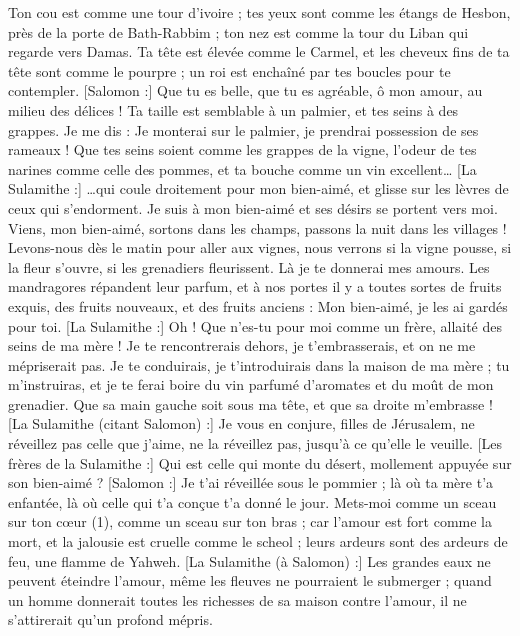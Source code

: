 \begin{multicols}{2}
Ton cou est comme une tour d'ivoire ; tes yeux sont comme les étangs de Hesbon, près de la porte de Bath-Rabbim ; ton nez est comme la tour du Liban qui regarde vers Damas.
Ta tête est élevée comme le Carmel, et les cheveux fins de ta tête sont comme le pourpre ; un roi est enchaîné par tes boucles pour te contempler.
[Salomon :] Que tu es belle, que tu es agréable, ô mon amour, au milieu des délices !
Ta taille est semblable à un palmier, et tes seins à des grappes.
Je me dis : Je monterai sur le palmier, je prendrai possession de ses rameaux ! Que tes seins soient comme les grappes de la vigne, l’odeur de tes narines comme celle des pommes,
et ta bouche comme un vin excellent… [La Sulamithe :] …qui coule droitement pour mon bien-aimé, et glisse sur les lèvres de ceux qui s’endorment.
Je suis à mon bien-aimé et ses désirs se portent vers moi.
Viens, mon bien-aimé, sortons dans les champs, passons la nuit dans les villages !
Levons-nous dès le matin pour aller aux vignes, nous verrons si la vigne pousse, si la fleur s’ouvre, si les grenadiers fleurissent. Là je te donnerai mes amours.
Les mandragores répandent leur parfum, et à nos portes il y a toutes sortes de fruits exquis, des fruits nouveaux, et des fruits anciens : Mon bien-aimé, je les ai gardés pour toi.
\VerseOne{}[La Sulamithe :] Oh ! Que n’es-tu pour moi comme un frère, allaité des seins de ma mère ! Je te rencontrerais dehors, je t’embrasserais, et on ne me mépriserait pas.
Je te conduirais, je t’introduirais dans la maison de ma mère ; tu m’instruiras, et je te ferai boire du vin parfumé d'aromates et du moût de mon grenadier.
Que sa main gauche soit sous ma tête, et que sa droite m'embrasse !
[La Sulamithe (citant Salomon) :] Je vous en conjure, filles de Jérusalem, ne réveillez pas celle que j'aime, ne la réveillez pas, jusqu'à ce qu'elle le veuille.
[Les frères de la Sulamithe :] Qui est celle qui monte du désert, mollement appuyée sur son bien-aimé ? [Salomon :] Je t'ai réveillée sous le pommier ; là où ta mère t'a enfantée, là où celle qui t'a conçue t'a donné le jour.
Mets-moi comme un sceau sur ton cœur (1), comme un sceau sur ton bras ; car l'amour est fort comme la mort, et la jalousie est cruelle comme le scheol ; leurs ardeurs sont des ardeurs de feu, une flamme de Yahweh.
[La Sulamithe (à Salomon) :] Les grandes eaux ne peuvent éteindre l’amour, même les fleuves ne pourraient le submerger ; quand un homme donnerait toutes les richesses de sa maison contre l’amour, il ne s’attirerait qu’un profond mépris.

\end{multicols}
